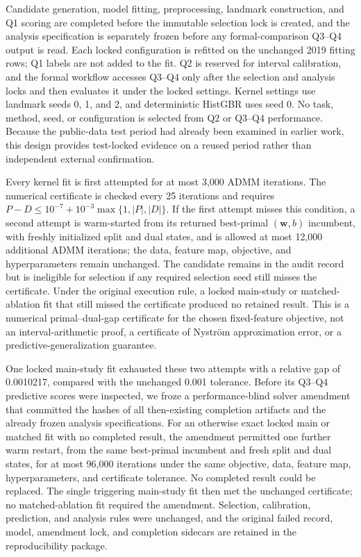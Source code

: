 {\color{blue}Candidate generation, model fitting, preprocessing, landmark construction, and Q1 scoring are completed before the immutable selection lock is created, and the analysis specification is separately frozen before any formal-comparison Q3--Q4 output is read. Each locked configuration is refitted on the unchanged 2019 fitting rows; Q1 labels are not added to the fit. Q2 is reserved for interval calibration, and the formal workflow accesses Q3--Q4 only after the selection and analysis locks and then evaluates it under the locked settings. Kernel settings use landmark seeds 0, 1, and 2, and deterministic HistGBR uses seed 0. No task, method, seed, or configuration is selected from Q2 or Q3--Q4 performance. Because the public-data test period had already been examined in earlier work, this design provides test-locked evidence on a reused period rather than independent external confirmation.}

{\color{blue}Every kernel fit is first attempted for at most 3,000 ADMM iterations. The numerical certificate is checked every 25 iterations and requires $P-D\leq 10^{-7}+10^{-3}\max\{1,|P|,|D|\}$. If the first attempt misses this condition, a second attempt is warm-started from its returned best-primal $(\boldsymbol{w},b)$ incumbent, with freshly initialized split and dual states, and is allowed at most 12,000 additional ADMM iterations; the data, feature map, objective, and hyperparameters remain unchanged. The candidate remains in the audit record but is ineligible for selection if any required selection seed still misses the certificate. Under the original execution rule, a locked main-study or matched-ablation fit that still missed the certificate produced no retained result. This is a numerical primal--dual-gap certificate for the chosen fixed-feature objective, not an interval-arithmetic proof, a certificate of Nystr\"om approximation error, or a predictive-generalization guarantee.}

{\color{blue}One locked main-study fit exhausted these two attempts with a relative gap of 0.0010217, compared with the unchanged 0.001 tolerance. Before its Q3--Q4 predictive scores were inspected, we froze a performance-blind solver amendment that committed the hashes of all then-existing completion artifacts and the already frozen analysis specifications. For an otherwise exact locked main or matched fit with no completed result, the amendment permitted one further warm restart, from the same best-primal incumbent and fresh split and dual states, for at most 96,000 iterations under the same objective, data, feature map, hyperparameters, and certificate tolerance. No completed result could be replaced. The single triggering main-study fit then met the unchanged certificate; no matched-ablation fit required the amendment. Selection, calibration, prediction, and analysis rules were unchanged, and the original failed record, model, amendment lock, and completion sidecars are retained in the reproducibility package.}

